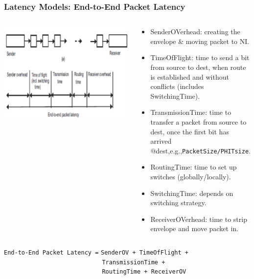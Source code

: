 \documentclass{beamer}
\newcommand{\emp}[1]{\textcolor{DikuRed}{ #1}}
\begin{document}
\begin{frame}[fragile,t]
\frametitle{Latency Models: End-to-End Packet Latency} 

\begin{columns}
\includegraphics[width=42ex]{Figures/FigsInterconnect/LatencyModel}
\begin{scriptsize}
\begin{itemize}
    \item \emp{SenderOV}erhead: creating the envelope \& moving packet to NI.
    \item \emp{TimeOfFlight}: time to send a bit from source to dest, when
                route is established and without conflicts (includes \emp{SwitchingTime}).
    \item \emp{TransmissionTime}: time to transfer a packet from source to dest, once
                the first bit has arrived @dest,e.g.,{\tt PacketSize/PHITsize}.
    \item \emp{RoutingTime}: time to set up switches (globally/locally).
    \item \emp{SwitchingTime}: depends on switching strategy.
    \item \emp{ReceiverOV}erhead: time to strip envelope and move packet in.
\end  {itemize}
\end{scriptsize}
\end{columns}
\bigskip

\alert{\tt End-to-End Packet Latency =} \emp{\tt SenderOV + TimeOfFlight + }
\emp{\tt~~~~~~~~~~~~~~~~~~~~~~~~~~~~TransmissionTime + }
\emp{\tt~~~~~~~~~~~~~~~~~~~~~~~~~~~~RoutingTime + ReceiverOV}

\end{frame}
\end{document}
